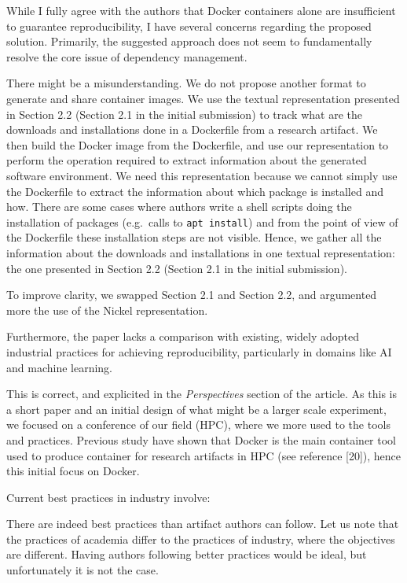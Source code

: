 \documentclass[%
	11pt,
	final,
]{article}
\makeatletter
\newcommand{\eg}{e.g.\@}
\makeatother
\begin{document}
While I fully agree with the authors that Docker containers alone are insufficient to guarantee reproducibility, I have several concerns regarding the proposed solution.
Primarily, the suggested approach does not seem to fundamentally resolve the core issue of dependency management.
\begin{review-answer}
  There might be a misunderstanding.
  We do not propose another format to generate and share container images.
  We use the textual representation presented in Section 2.2 (Section 2.1 in the initial submission) to track what are the downloads and installations done in a Dockerfile from a research artifact.
  We then build the Docker image from the Dockerfile, and use our representation to perform the operation required to extract information about the generated software environment.
  We need this representation because we cannot simply use the Dockerfile to extract the information about which package is installed and how.
  There are some cases where authors write a shell scripts doing the installation of packages (\eg\ calls to \texttt{apt install}) and from the point of view of the Dockerfile these installation steps are not visible.
  Hence, we gather all the information about the downloads and installations in one textual representation: the one presented in Section 2.2 (Section 2.1 in the initial submission).


  To improve clarity, we swapped Section 2.1 and Section 2.2, and argumented more the use of the Nickel representation.
\end{review-answer}
Furthermore, the paper lacks a comparison with existing, widely adopted industrial practices for achieving reproducibility, particularly in domains like AI and machine learning.
\begin{review-answer}
  This is correct, and explicited in the \emph{Perspectives} section of the article.
  As this is a short paper and an initial design of what might be a larger scale experiment, we focused on a conference of our field (HPC), where we more used to the tools and practices.
  Previous study have shown that Docker is the main container tool used to produce container for research artifacts in HPC (see reference [20]), hence this initial focus on Docker.
\end{review-answer}

Current best practices in industry involve:

\begin{review-answer}
  There are indeed best practices than artifact authors can follow.
  Let us note that the practices of academia differ to the practices of industry, where the objectives are different.
  Having authors following better practices would be ideal, but unfortunately it is not the case.
\end{review-answer}
\end{document}
